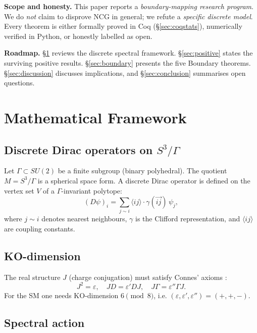 \documentclass[11pt,a4paper]{article}
\theoremstyle{definition}
\begin{document}
\textbf{Scope and honesty.} This paper reports a \emph{boundary-mapping research program}. We do \emph{not} claim to disprove NCG in general; we refute a
\emph{specific discrete model}. Every theorem is either formally proved in
Coq (\S\ref{sec:coqstats}), numerically verified in Python, or honestly
labelled as open.

\textbf{Roadmap.} \S\ref{sec:framework} reviews the discrete spectral
framework. \S\ref{sec:positive} states the surviving positive results.
\S\ref{sec:boundary} presents the five Boundary theorems. \S\ref{sec:discussion}
discusses implications, and \S\ref{sec:conclusion} summarises open questions.

\section{Mathematical Framework}\label{sec:framework}

\subsection{Discrete Dirac operators on $S^3/\Gamma$}

Let $\Gamma \subset SU(2)$ be a finite subgroup (binary polyhedral). The
quotient $M = S^3/\Gamma$ is a spherical space form. A discrete Dirac
operator is defined on the vertex set $V$ of a $\Gamma$-invariant polytope:
\begin{equation}\label{eq:dirac}
  (D\psi)_i = \sum_{j \sim i} \langle i j \rangle \cdot \gamma(\overrightarrow{ij}) \, \psi_j,
\end{equation}
where $j \sim i$ denotes nearest neighbours, $\gamma$ is the Clifford
representation, and $\langle i j \rangle$ are coupling constants.

\subsection{KO-dimension}

The real structure $J$ (charge conjugation) must satisfy Connes' axioms
\cite{Connes:1996}:
\begin{equation}
  J^2 = \varepsilon, \quad JD = \varepsilon' DJ, \quad J\Gamma = \varepsilon'' \Gamma J.
\end{equation}
For the SM one needs KO-dimension $6 \pmod 8$, i.e.
$(\varepsilon, \varepsilon', \varepsilon'') = (+, +, -)$.

\subsection{Spectral action}
\end{document}
